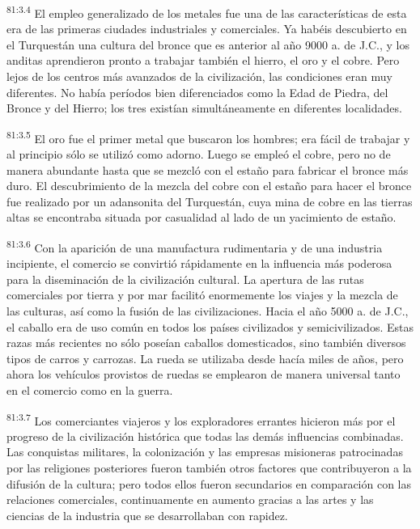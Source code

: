 \par
\textsuperscript{81:3.4} El empleo generalizado de los metales fue una de las características de esta era de las primeras ciudades industriales y comerciales. Ya habéis descubierto en el Turquestán una cultura del bronce que es anterior al año 9000 a. de J.C., y los anditas aprendieron pronto a trabajar también el hierro, el oro y el cobre. Pero lejos de los centros más avanzados de la civilización, las condiciones eran muy diferentes. No había períodos bien diferenciados como la Edad de Piedra, del Bronce y del Hierro; los tres existían simultáneamente en diferentes localidades.

\par
\textsuperscript{81:3.5} El oro fue el primer metal que buscaron los hombres; era fácil de trabajar y al principio sólo se utilizó como adorno. Luego se empleó el cobre, pero no de manera abundante hasta que se mezcló con el estaño para fabricar el bronce más duro. El descubrimiento de la mezcla del cobre con el estaño para hacer el bronce fue realizado por un adansonita del Turquestán, cuya mina de cobre en las tierras altas se encontraba situada por casualidad al lado de un yacimiento de estaño.

\par
\textsuperscript{81:3.6} Con la aparición de una manufactura rudimentaria y de una industria incipiente, el comercio se convirtió rápidamente en la influencia más poderosa para la diseminación de la civilización cultural. La apertura de las rutas comerciales por tierra y por mar facilitó enormemente los viajes y la mezcla de las culturas, así como la fusión de las civilizaciones. Hacia el año 5000 a. de J.C., el caballo era de uso común en todos los países civilizados y semicivilizados. Estas razas más recientes no sólo poseían caballos domesticados, sino también diversos tipos de carros y carrozas. La rueda se utilizaba desde hacía miles de años, pero ahora los vehículos provistos de ruedas se emplearon de manera universal tanto en el comercio como en la guerra.

\par
\textsuperscript{81:3.7} Los comerciantes viajeros y los exploradores errantes hicieron más por el progreso de la civilización histórica que todas las demás influencias combinadas. Las conquistas militares, la colonización y las empresas misioneras patrocinadas por las religiones posteriores fueron también otros factores que contribuyeron a la difusión de la cultura; pero todos ellos fueron secundarios en comparación con las relaciones comerciales, continuamente en aumento gracias a las artes y las ciencias de la industria que se desarrollaban con rapidez.

